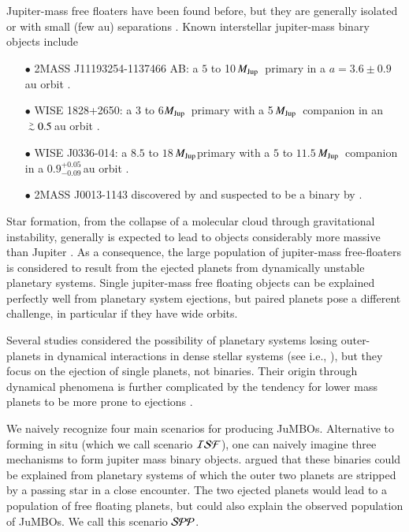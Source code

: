 \documentclass[aa]{lib/aa}
\newcommand{\MJup}{\mbox{${M}_{\rm Jup}$}}
\def\apgt{\ {\raise-.5ex\hbox{$\buildrel>\over\sim$}}\ }
\newcommand{\jumbos}{\mbox{JuMBOs}}
\begin{document}
Jupiter-mass free floaters have been found before, but they are
generally isolated or with small (few au) separations
\citep{2021ApJS..253....7K}.  Known interstellar jupiter-mass binary
objects include\\
\begin{itemize}
\item[$\bullet$]2MASS J11193254-1137466 AB: a $5$ to 10\,\MJup\,
  primary in a $a=3.6\pm0.9$\,au orbit \citep{2017ApJ...843L...4B}.
\item[$\bullet$]WISE 1828+2650: a 3 to 6\MJup\, primary with a
  5\,\MJup\ companion in an $\apgt 0.5$\,au orbit
  \citep{2013ApJ...764..101B}.
\item[$\bullet$] WISE J0336-014: a $8.5$ to
  $18$\,\MJup primary with a $5$ to $11.5$\,\MJup\, companion in a
  $0.9^{+0.05}_{-0.09}$\,au orbit \citep{2023ApJ...947L..30C}.
\item[$\bullet$]2MASS J0013-1143 discovered by \cite{2017AJ....154..112K} and
  suspected to be a binary by \cite{2019A&A...629A.145E}.
\end{itemize}

Star formation, from the collapse of a molecular cloud through
gravitational instability, generally is expected to lead to objects
considerably more massive than Jupiter
\citep{1976MNRAS.176..367L,2005A&A...430.1059B}.  As a consequence,
the large population of jupiter-mass free-floaters is considered to
result from the ejected planets from dynamically unstable planetary
systems. Single jupiter-mass free floating objects can be explained
perfectly well from planetary system ejections, but paired planets
pose a different challenge, in particular if they have wide orbits.

Several studies considered the possibility of planetary systems losing
outer-planets in dynamical interactions in dense stellar systems (see
i.e., \cite{1996Sci...274..954R,2015MNRAS.453.2759Z,
  2017MNRAS.470.4337C, 2019MNRAS.489.2280F, 2019A&A...624A.120V}), but
they focus on the ejection of single planets, not binaries.  Their
origin through dynamical phenomena is further complicated by the
tendency for lower mass planets to be more prone to ejections
\citep{2001Icar..150..303F,2013MNRAS.433..867H,2019MNRAS.489.2280F,2020MNRAS.497.1807S}.

We naively recognize four main scenarios for producing \jumbos.
Alternative to forming in situ (which we call scenario ${\cal ISF}$),
one can naively imagine three mechanisms to form jupiter mass binary
objects. \cite{2023arXiv231006016W} argued that these binaries could
be explained from planetary systems of which the outer two planets are
stripped by a passing star in a close encounter. The two ejected
planets would lead to a population of free floating planets, but could
also explain the observed population of \jumbos.  We call this
scenario ${\cal SPP}$.
\end{document}
